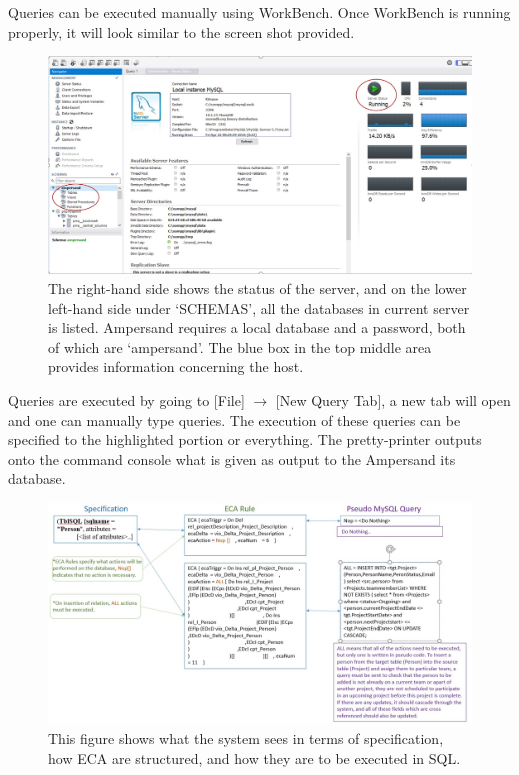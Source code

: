 Queries can be executed manually using WorkBench.
Once WorkBench is running properly, it will look 
similar to the screen shot provided.
\begin{figure}[!h]
    \includegraphics[width=\textwidth]{images/WorkBench}
    \caption{\footnotesize{The right-hand side shows the status of the server, 
    and on the lower left-hand side under `SCHEMAS', all the databases in 
    current server is listed. Ampersand requires a local database and a 
    password, both of which are `ampersand'. The blue box in the top middle 
    area provides information concerning the host. }}
\end{figure}

Queries are executed by going to [File] $\rightarrow$ [New Query Tab], a new 
tab will open and one can manually type queries. The execution of these queries 
can be specified to the highlighted portion or everything. The pretty-printer 
outputs onto the command console what is given as output to the Ampersand its 
database. 

\begin{figure}[!h]
    \includegraphics[width=\textwidth]{images/sqlquery}
    \caption{\footnotesize{This figure shows what the system sees in terms of 
    specification, how ECA are structured, and how they are to be executed in 
    SQL. }}
\end{figure}





